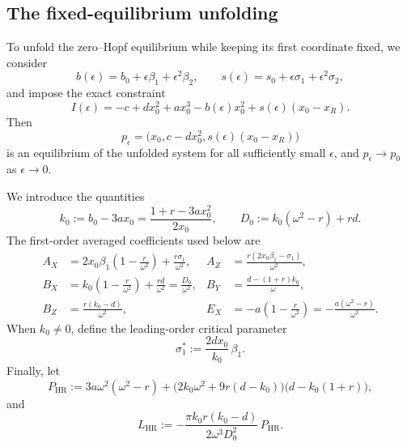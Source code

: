 \documentclass[11pt]{amsart}
\theoremstyle{remark}
\newcommand{\PHR}{P_{\mathrm{HR}}}
\newcommand{\LHR}{L_{\mathrm{HR}}}
\begin{document}
\subsection{The fixed-equilibrium unfolding}

To unfold the zero--Hopf equilibrium while keeping its first coordinate fixed,
we consider
\begin{equation}\label{eq:unfolding-bs}
 b(\epsilon)=b_0+\epsilon\beta_1+\epsilon^2\beta_2,
 \qquad
 s(\epsilon)=s_0+\epsilon\sigma_1+\epsilon^2\sigma_2,
\end{equation}
and impose the exact constraint
\begin{equation}\label{eq:unfolding-I}
 I(\epsilon)=-c+dx_0^2+ax_0^3-b(\epsilon)x_0^2
              +s(\epsilon)(x_0-x_R).
\end{equation}
Then
\begin{equation}\label{eq:pepsilon}
 p_\epsilon=\bigl(x_0,c-dx_0^2,s(\epsilon)(x_0-x_R)\bigr)
\end{equation}
is an equilibrium of the unfolded system for all sufficiently small
\(\epsilon\), and \(p_\epsilon\to p_0\) as \(\epsilon\to0\).

We introduce the quantities
\begin{equation}\label{eq:k0D0}
 k_0:=b_0-3ax_0=\frac{1+r-3ax_0^2}{2x_0},
 \qquad
 D_0:=k_0(\omega^2-r)+rd.
\end{equation}
The first-order averaged coefficients used below are
\begin{equation}\label{eq:averaged-coefficients}
\begin{aligned}
A_X&=2x_0\beta_1\left(1-\frac{r}{\omega^2}\right)
     +\frac{r\sigma_1}{\omega^2},&
A_Z&=\frac{r(2x_0\beta_1-\sigma_1)}{\omega^2},\\
B_X&=k_0\left(1-\frac{r}{\omega^2}\right)+\frac{rd}{\omega^2}
     =\frac{D_0}{\omega^2},&
B_Y&=\frac{d-(1+r)k_0}{\omega},\\
B_Z&=\frac{r(k_0-d)}{\omega^2},&
E_X&=-a\left(1-\frac{r}{\omega^2}\right)
     =-\frac{a(\omega^2-r)}{\omega^2}.
\end{aligned}
\end{equation}
When \(k_0\ne0\), define the leading-order critical parameter
\begin{equation}\label{eq:sigma-star}
 \sigma_1^*:=\frac{2dx_0}{k_0}\,\beta_1.
\end{equation}
Finally, let
\begin{equation}\label{eq:PHR}
 \PHR:=3a\omega^2(\omega^2-r)
 +\bigl(2k_0\omega^2+9r(d-k_0)\bigr)
 \bigl(d-k_0(1+r)\bigr),
\end{equation}
and
\begin{equation}\label{eq:LHR}
 \LHR:=-\frac{\pi k_0r(k_0-d)}{2\omega^3D_0^2}\,\PHR.
\end{equation}
\end{document}
